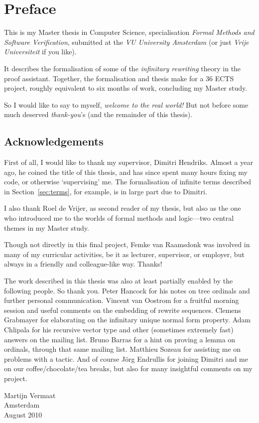 \chapter*{Preface}
\thispagestyle{empty}

This is my Master thesis in Computer Science,
specialisation \emph{Formal Methods and Software Verification},
submitted at the \emph{VU University Amsterdam} (or just \emph{Vrije
  Universiteit} if you like).

It describes the formalisation of some of the \emph{infinitary
  rewriting} theory in the \Coq proof assistant.
Together, the formalisation and thesis make
for a 36 ECTS project, roughly equivalent to six months of work,
concluding my Master study.

So I would like to say to myself, \emph{welcome to the real world!}
But not before some much deserved \emph{thank-you}'s (and the
remainder of this thesis).


\section*{Acknowledgements}

First of all, I would like to thank my supervisor, Dimitri
Hendriks. Almost a year ago, he coined the title of this thesis, and
has since spent many hours fixing my \Coq code, or otherwise
`supervising' me. The formalisation of infinite terms described in
Section~\ref{sec:terms}, for example, is in large part due to
Dimitri.

I also thank Roel de Vrijer, as second reader of my thesis, but also
as the one who introduced me to the worlds of formal methods and
logic---two central themes in my Master study.

Though not directly in this final project, Femke van Raamsdonk was
involved in many of my curricular activities, be it as lecturer,
supervisor, or employer, but always in a friendly and colleague-like
way. Thanks!

The work described in this thesis was also at least partially enabled
by the following people. So thank you. Peter Hancock for his notes on
tree ordinals and further personal communication. Vincent van Oostrom
for a fruitful morning session and useful comments on the embedding of
rewrite sequences. Clemens Grabmayer for elaborating on the infinitary
unique normal form property. Adam Chlipala for his recursive vector type and
other (sometimes extremely fast) answers on the \Coq mailing
list. Bruno Barras for a hint on proving a lemma on ordinals, through
that same mailing list. Matthieu Sozeau for assisting me on problems
with a \Coq tactic. And of course J\"org Endrullis for joining Dimitri
and me on our coffee/chocolate/tea breaks, but also for many insightful
comments on my project.


\thispagestyle{empty}

\begin{flushright}
  Martijn Vermaat\\
  Amsterdam\\
  August 2010
\end{flushright}
